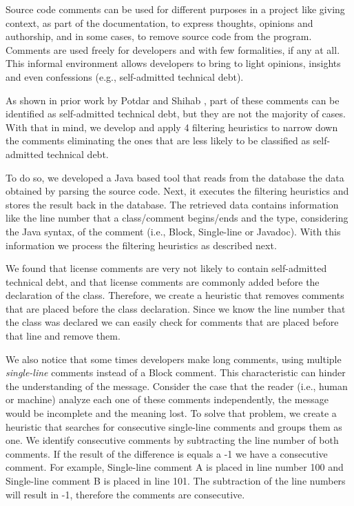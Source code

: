 Source code comments can be used for different purposes in a project like giving context, as part of the documentation, to express thoughts, opinions and authorship, and in some cases, to remove source code from the program. Comments are used freely for developers and with few formalities, if any at all. This informal environment allows developers to bring to light opinions, insights and even confessions (e.g., self-admitted technical debt). 

As shown in prior work by Potdar and Shihab \cite{Potdar2014ICSME}, part of these comments can be identified as self-admitted technical debt, but they are not the majority of cases. With that in mind, we develop and apply 4 filtering heuristics to narrow down the comments eliminating the ones that are less likely to be classified as self-admitted technical debt.

To do so, we developed a Java based tool that reads from the database the data obtained by parsing the source code. Next, it executes the filtering heuristics and stores the result back in the database. The retrieved data contains information like the line number that a class/comment begins/ends and the type, considering the Java syntax, of the comment (i.e., Block, Single-line or Javadoc). With this information we process the filtering heuristics as described next.

We found that license comments are very not likely to contain self-admitted technical debt, and that license comments are commonly added before the declaration of the class. Therefore, we create a heuristic that removes comments that are placed before the class declaration. Since we know the line number that the class was declared we can easily check for comments that are placed before that line and remove them. 

We also notice that some times developers make long comments, using multiple \emph{single-line} comments instead of a Block comment. This characteristic can hinder the understanding of the message. Consider the case that the reader (i.e., human or machine) analyze each one of these comments independently, the message would be incomplete and the meaning lost. To solve that problem, we create a heuristic that searches for consecutive single-line comments and groups them as one. We identify consecutive comments by subtracting the line number of both comments. If the result of the difference is equals a -1 we have a consecutive comment. For example, Single-line comment A is placed in line number 100 and Single-line comment B is placed in line 101. The subtraction of the line numbers will result in -1, therefore the comments are consecutive.
 
